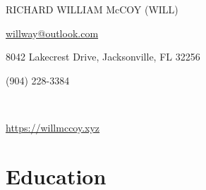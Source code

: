 \documentclass{article}
\newcommand\midtextbox[1]{%
  \parbox{.6\textwidth}{#1}%
}
\newcommand\outtextbox[1]{%
  \parbox{.2\textwidth}{#1}%
}
\newenvironment{TitleCenter}[1][\topsep]
  {\setlength{\topsep}{#1}\par\kern\topsep\centering}%
  {\par\kern\topsep}%
\begin{document}
\thispagestyle{empty}

\begin{TitleCenter}[0em]
\bfseries\huge

RICHARD WILLIAM McCOY (WILL)
\end{TitleCenter}
\noindent\outtextbox{\href{willway@outlook.com}{willway@outlook.com}\hfill}\midtextbox{\hfil8042 Lakecrest Drive, Jacksonville, FL 32256\hfil}\outtextbox{\hfill (904) 228-3384} \\
\noindent\outtextbox{\href{https://willmccoy.xyz}{https://willmccoy.xyz}\hfill}\midtextbox{\hfil\hfil}\outtextbox{\hfill}


\vspace{-1em}
\section{Education}
\end{document}

